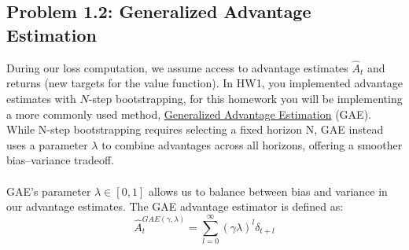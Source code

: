 \documentclass[12pt]{article}
\begin{document}


\newpage

\subsection*{Problem 1.2: Generalized Advantage Estimation}
During our loss computation, we assume access to advantage estimates $\hat{A}_t$ and returns (new targets for the value function). In HW1, you implemented advantage estimates with $N$-step bootstrapping, for this homework you will be implementing a more commonly used method, \href{https://arxiv.org/abs/1506.02438}{Generalized Advantage Estimation} (GAE). While N-step bootstrapping requires selecting a fixed horizon N, GAE instead uses a parameter $\lambda$ to combine advantages across all horizons, offering a smoother bias–variance tradeoff. 
\\
\\
GAE's parameter $\lambda \in [0,1]$ allows us to balance between bias and variance in our advantage estimates. The GAE advantage estimator is defined as:
\begin{equation}
\hat{A}_t^{GAE(\gamma,\lambda)} = \sum_{l=0}^{\infty} (\gamma\lambda)^l \delta_{t+l}
\end{equation}
\end{document}
